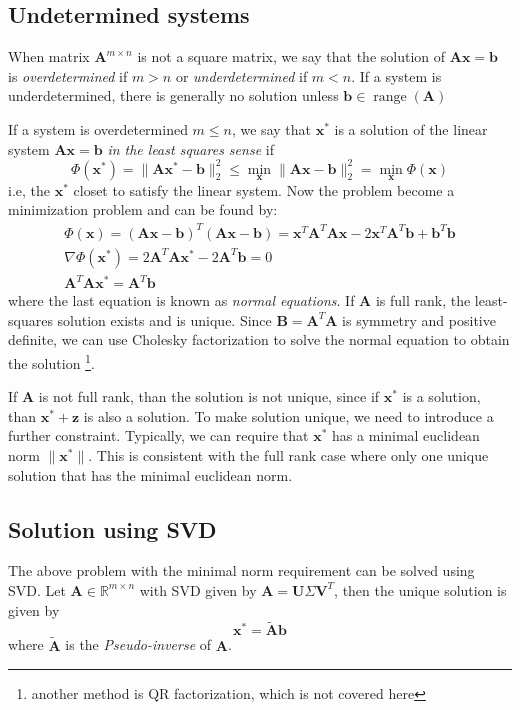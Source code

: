 \documentclass{article}
\DeclareMathOperator{\range}{range}
\begin{document}
\subsection{Undetermined systems}
When matrix $\mathbf{A}^{m\times n}$ is not a square matrix, we say that 
the solution of $\mathbf{A}\mathbf{x} = \mathbf{b}$ is \emph{overdetermined} if $m>n$ 
or \emph{underdetermined} if $m < n$. 
If a system is underdetermined, there is generally no solution unless 
$\mathbf{b}\in \range(\mathbf{A})$

If a system is overdetermined $m \leq n$, we say that $\mathbf{x}^*$ is a solution
of the linear system $\mathbf{A}\mathbf{x} = \mathbf{b}$ \emph{in the least squares sense}
if 
\begin{equation}
    \Phi(\mathbf{x}^*) = \|\mathbf{A}\mathbf{x}^* - \mathbf{b}\|_2^2 
    \leq \min_{\mathbf{x}} \|\mathbf{A}\mathbf{x} - \mathbf{b}\|_2^2 
    = \min_{\mathbf{x}} \Phi(\mathbf{x})
\end{equation}
i.e, the $\mathbf{x}^*$ closet to satisfy the linear system. Now the problem 
become a minimization problem and can be found by:
\begin{gather*}
    \Phi(\mathbf{x}) 
    = (\mathbf{A}\mathbf{x} - \mathbf{b})^T (\mathbf{A}\mathbf{x} - \mathbf{b})
    = \mathbf{x}^T \mathbf{A}^T \mathbf{A} \mathbf{x} - 2 \mathbf{x}^T \mathbf{A}^T \mathbf{b} 
      +  \mathbf{b}^T \mathbf{b} \\
    \nabla \Phi(\mathbf{x}^*) 
    = 2 \mathbf{A}^T \mathbf{A} \mathbf{x}^* - 2 \mathbf{A}^T \mathbf{b} = 0 \\
    \mathbf{A}^T \mathbf{A} \mathbf{x}^* = \mathbf{A}^T \mathbf{b}
\end{gather*}
where the last equation is known as \emph{normal equations}. If $\mathbf{A}$ is full rank, the 
least-squares solution exists and is unique. 
Since $\mathbf{B} = \mathbf{A}^T \mathbf{A}$ is symmetry and positive definite, we can use 
Cholesky factorization to solve the normal equation to obtain the solution
\footnote{another method is QR factorization, which is not covered here}.

If $\mathbf{A}$ is not full rank, than the solution is not unique, since if $\mathbf{x}^*$ 
is a solution, than $\mathbf{x}^* + \mathbf{z}$ is also a solution. To make solution unique,
we need to introduce a further constraint. Typically, we can require that $\mathbf{x}^*$
has a minimal euclidean norm $\|\mathbf{x}^*\|$.
This is consistent with the full rank case where only one unique solution that has the 
minimal euclidean norm. 

\subsection{Solution using SVD}
The above problem with the minimal norm requirement can be solved using SVD.
Let $\mathbf{A}\in \mathbb{R}^{m\times n}$ with SVD given by 
$\mathbf{A} = \mathbf{U}\Sigma \mathbf{V}^T$, then the unique solution is 
given by
\begin{equation}
    \mathbf{x}^* = \tilde{\mathbf{A}} \mathbf{b}
\end{equation}
where $\tilde{\mathbf{A}}$ is the \emph{Pseudo-inverse} of $\mathbf{A}$.
\end{document}
